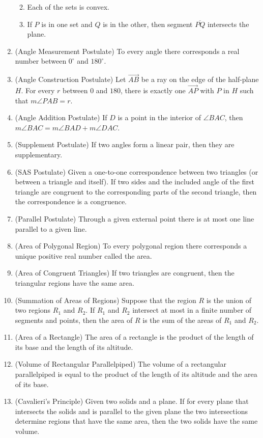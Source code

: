 \documentclass[
]{book}
\providecommand{\tightlist}{%
  \setlength{\itemsep}{0pt}\setlength{\parskip}{0pt}}
\theoremstyle{definition}
\theoremstyle{definition}
\theoremstyle{definition}
\theoremstyle{definition}
\theoremstyle{remark}
\begin{document}
\begin{enumerate}
  \begin{enumerate}
  \def\labelenumii{\alph{enumii}.}
  \tightlist
  \item
    Each of the sets is convex.
  \item
    If \(P\) is in one set and \(Q\) is in the other, then segment \(\overline{PQ}\) intersects the plane.
  \end{enumerate}
\item
  (Angle Measurement Postulate) To every angle there corresponds a real number between \(0^\circ\) and \(180^\circ\).
\item
  (Angle Construction Postulate) Let \(\overrightarrow{AB}\) be a ray on the edge of the half-plane \(H\). For every \(r\) between \(0\) and \(180\), there is exactly one \(\overrightarrow{AP}\) with \(P\) in \(H\) such that \(m\angle PAB = r\).
\item
  (Angle Addition Postulate) If \(D\) is a point in the interior of \(\angle BAC\), then \(m\angle BAC = m\angle BAD + m\angle DAC\).
\item
  (Supplement Postulate) If two angles form a linear pair, then they are supplementary.
\item
  (SAS Postulate) Given a one-to-one correspondence between two triangles (or between a triangle and itself). If two sides and the included angle of the first triangle are congruent to the corresponding parts of the second triangle, then the correspondence is a congruence.
\item
  (Parallel Postulate) Through a given external point there is at most one line parallel to a given line.
\item
  (Area of Polygonal Region) To every polygonal region there corresponds a unique positive real number called the area.
\item
  (Area of Congruent Triangles) If two triangles are congruent, then the triangular regions have the same area.
\item
  (Summation of Areas of Regions) Suppose that the region \(R\) is the union of two regions \(R_1\) and \(R_2\). If \(R_1\) and \(R_2\) intersect at most in a finite number of segments and points, then the area of \(R\) is the sum of the areas of \(R_1\) and \(R_2\).
\item
  (Area of a Rectangle) The area of a rectangle is the product of the length of its base and the length of its altitude.
\item
  (Volume of Rectangular Parallelpiped) The volume of a rectangular parallelpiped is equal to the product of the length of its altitude and the area of its base.
\item
  (Cavalieri's Principle) Given two solids and a plane. If for every plane that intersects the solids and is parallel to the given plane the two intersections determine regions that have the same area, then the two solids have the same volume.
\end{enumerate}
\end{document}
